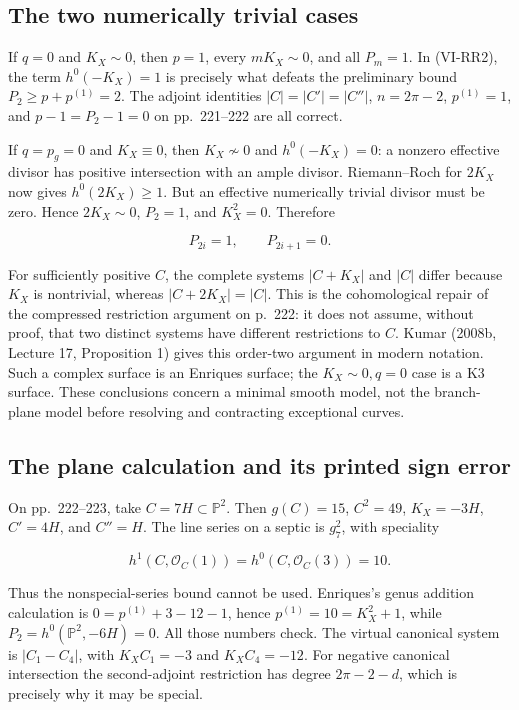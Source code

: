 \subsection{The two numerically trivial cases}

If \(q=0\) and \(K_X\sim0\), then \(p=1\), every \(mK_X\sim0\), and all \(P_m=1\). In (VI-RR2), the term \(h^0(-K_X)=1\) is precisely what defeats the preliminary bound \(P_2\geq p+p^{(1)}=2\). The adjoint identities \(|C|=|C'|=|C''|\), \(n=2\pi-2\), \(p^{(1)}=1\), and \(p-1=P_2-1=0\) on pp.~221--222 are all correct.

If \(q=p_g=0\) and \(K_X\equiv0\), then \(K_X\not\sim0\) and \(h^0(-K_X)=0\): a nonzero effective divisor has positive intersection with an ample divisor. Riemann--Roch for \(2K_X\) now gives \(h^0(2K_X)\geq1\). But an effective numerically trivial divisor must be zero. Hence \(2K_X\sim0\), \(P_2=1\), and \(K_X^2=0\). Therefore

\[
P_{2i}=1,\qquad P_{2i+1}=0.
\]

For sufficiently positive \(C\), the complete systems \(|C+K_X|\) and \(|C|\) differ because \(K_X\) is nontrivial, whereas \(|C+2K_X|=|C|\). This is the cohomological repair of the compressed restriction argument on p.~222: it does not assume, without proof, that two distinct systems have different restrictions to \(C\). Kumar (2008b, Lecture 17, Proposition 1) gives this order-two argument in modern notation. Such a complex surface is an Enriques surface; the \(K_X\sim0,q=0\) case is a K3 surface. These conclusions concern a minimal smooth model, not the branch-plane model before resolving and contracting exceptional curves.

\subsection{The plane calculation and its printed sign error}

On pp.~222--223, take \(C=7H\subset\mathbb P^2\). Then \(g(C)=15\), \(C^2=49\), \(K_X=-3H\), \(C'=4H\), and \(C''=H\). The line series on a septic is \(g^2_7\), with speciality

\[
h^1(C,\mathcal O_C(1))=h^0(C,\mathcal O_C(3))=10.
\]

Thus the nonspecial-series bound cannot be used. Enriques's genus addition calculation is \(0=p^{(1)}+3-12-1\), hence \(p^{(1)}=10=K_X^2+1\), while \(P_2=h^0(\mathbb P^2,-6H)=0\). All those numbers check. The virtual canonical system is \(|C_1-C_4|\), with \(K_X C_1=-3\) and \(K_X C_4=-12\). For negative canonical intersection the second-adjoint restriction has degree \(2\pi-2-d\), which is precisely why it may be special.

